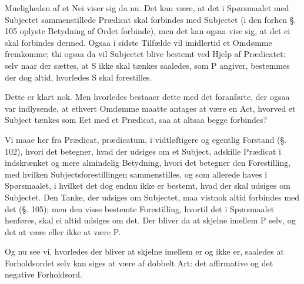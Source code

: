 \documentclass[12pt]{book}
\def\textit#1{#1}%
\def\emph#1{#1}%
\newcommand{\opage}[1]{\marginnote{\footnotesize\textit{[#1]}}}
\begin{document}
Mueligheden af et \emph{Nei} viser sig da nu. Det kan være, at det i Spørsmaalet med
Subjectet sammenstillede Prædicat skal forbindes med Subjectet (i den forhen §. 105 oplyste
Betydning af Ordet forbinde), men det kan ogsaa vise sig, at det ei skal forbindes dermed.
Ogsaa i sidste Tilfælde vil imidlertid et Omdømme fremkomme; thi ogsaa da vil Subjectet
blive bestemt
\opage{267} ved Hjelp af Prædicatet: selv naar der sættes, at \textit{S} ikke skal tænkes saaledes, som
\textit{P} angiver, bestemmes der dog altid, hvorledes \textit{S} skal forestilles.

Dette er klart nok. Men hvorledes bestaaer dette med det foranførte, der ogsaa var
indlysende, at ethvert Omdømme maatte antages at være en Act, hvorved et Subject tænkes som
Eet med et Prædicat, saa at altsaa begge forbindes?

Vi maae her fra Prædicat, \textit{prædicatum}, i vidtløftigere og egentlig Forstand
(§. 102), hvori det betegner, hvad der udsiges om et Subject, adskille Prædicat i
indskrænket og mere almindelig Betydning, hvori det betegner den Forestilling, med hvilken
Subjectsforestillingen sammenstilles, og som allerede haves i Spørsmaalet, i hvilket det
dog endnu ikke er bestemt, hvad der skal udsiges om Subjectet. Den Tanke, der udsiges om
Subjectet, maa vistnok altid forbindes med det (§. 105); men den visse bestemte
Forestilling, hvortil det i Spørsmaalet henføres, skal ei altid udsiges om det. Der bliver
da at skjelne imellem \textit{P} selv, og det at være eller ikke at være \textit{P}.

Og nu see vi, hvorledes der bliver at skjelne imellem er og ikke er, saaledes at
Forholdsordet selv kan siges at være af dobbelt Art: det affirmative og det negative
Forholdsord.
\end{document}

